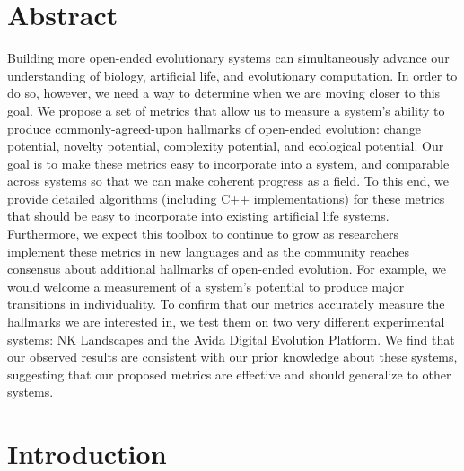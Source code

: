 \documentclass[letterpaper]{article}
\providecommand{\DIFaddbegin}{} %
\providecommand{\DIFaddend}{} %
\begin{document}
\DIFaddend \section{Abstract}

Building more open-ended evolutionary systems can simultaneously advance our understanding of biology, artificial life, and evolutionary computation. In order to do so, however, we need a way to determine when we are moving closer to this goal. We propose a set of metrics that allow us to measure a system's ability to produce commonly-agreed-upon hallmarks of open-ended evolution: change potential, novelty potential, complexity potential, and ecological potential. Our goal is to make these metrics easy to incorporate into a system, and comparable across systems so that we can make coherent progress as a field. To this end, we provide detailed algorithms (including C++ implementations) for these metrics that should be easy to incorporate into existing artificial life systems. Furthermore, we expect this toolbox to continue to grow as researchers implement these metrics in new languages and as the community reaches consensus about additional hallmarks of open-ended evolution. %
For example, we would welcome a measurement of a system's potential to produce major transitions in individuality. To confirm that our metrics accurately measure the hallmarks we are interested in, we test them on two very different experimental systems: NK Landscapes and the Avida Digital Evolution Platform. We find that our observed results are consistent with our prior knowledge about these systems, suggesting that our proposed metrics are effective and should generalize to other systems.


\DIFaddbegin \newpage

\maketitle

\vspace{1.1in}


\DIFaddend \section{Introduction}
\end{document}
